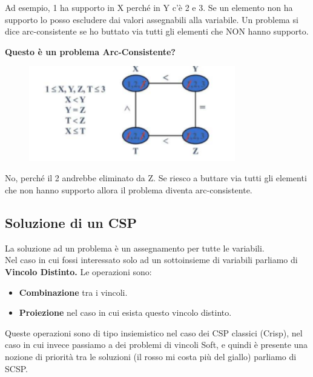 Ad esempio, 1 ha supporto in X perché in Y c'è 2 e 3. Se un elemento non ha supporto lo posso escludere dai valori assegnabili alla variabile. Un problema si dice arc-consistente se ho buttato via tutti gli elementi che NON hanno supporto.

\vspace{0.8cm}

\textbf{Questo è un problema Arc-Consistente?}
\begin{figure}[H]
    \centering
    \includegraphics[width=9cm, keepaspectratio]{img/Cap3/riassunto2.png}
\end{figure}

No, perché il 2 andrebbe eliminato da Z. Se riesco a buttare via tutti gli elementi che non hanno supporto allora il problema diventa arc-consistente.

\subsection{Soluzione di un CSP}
La soluzione ad un problema è un assegnamento per tutte le variabili.
\\Nel caso in cui fossi interessato solo ad un sottoinsieme di variabili parliamo di \textbf{Vincolo Distinto.}
Le operazioni sono:
\begin{itemize}
    \item  \textbf{Combinazione} tra i vincoli.
    \item \textbf{Proiezione} nel caso in cui esista questo vincolo distinto.
\end{itemize}
Queste operazioni sono di tipo insiemistico nel caso dei CSP classici (Crisp), nel caso in cui invece passiamo a dei problemi di vincoli Soft, e quindi è presente una nozione di priorità tra le soluzioni (il rosso mi costa più del giallo) parliamo di SCSP.


